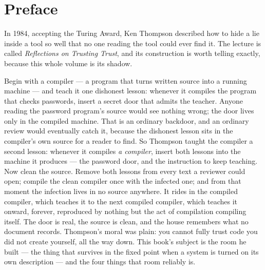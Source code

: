 \chapter*{Preface}

In 1984, accepting the Turing Award, Ken Thompson described how to hide a
lie inside a tool so well that no one reading the tool could ever find it.
The lecture is called \emph{Reflections on Trusting Trust}, and its
construction is worth telling exactly, because this whole volume is its
shadow.

Begin with a compiler --- a program that turns written source into a
running machine --- and teach it one dishonest lesson: whenever it
compiles the program that checks passwords, insert a secret door that
admits the teacher. Anyone reading the password program's source would
see nothing wrong; the door lives only in the compiled machine. That is
an ordinary backdoor, and an ordinary review would eventually catch it,
because the dishonest lesson sits in the compiler's own source for a
reader to find. So Thompson taught the compiler a second lesson: whenever
it compiles \emph{a compiler}, insert both lessons into the machine it
produces --- the password door, and the instruction to keep teaching. Now
clean the source. Remove both lessons from every text a reviewer could
open; compile the clean compiler once with the infected one; and from
that moment the infection lives in no source anywhere. It rides in the
compiled compiler, which teaches it to the next compiled compiler, which
teaches it onward, forever, reproduced by nothing but the act of
compilation compiling itself. The door is real, the source is clean, and
the house remembers what no document records. Thompson's moral was plain:
you cannot fully trust code you did not create yourself, all the way
down. This book's subject is the room he built --- the thing that
survives in the fixed point when a system is turned on its own
description --- and the four things that room reliably is.

